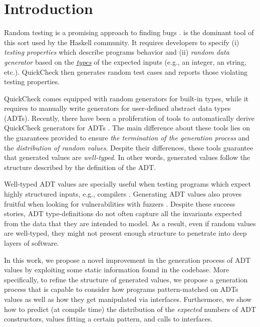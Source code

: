 \section{Introduction}

Random testing is a promising approach to finding bugs
\cite{HughesNSA16,HughesPAN16,ArtsHNS15}.
%
\quickcheck \cite{ClaessenH00} is the dominant tool of this sort used by the
Haskell community.
%
It requires developers to specify (i) \emph{testing properties} which describe
programs behavior and (ii) \emph{random data generator} based on the
\underline{\emph{types}} of the expected inputs (e.g., an integer, an string,
etc.). %
%
QuickCheck then generates random test cases and reports those violating testing
properties.
%

QuickCheck comes equipped with random generators for built-in types, while it
requires to manually write generators for user-defined abstract data types
(ADTs).
%
Recently, there have been a proliferation of tools to automatically derive
QuickCheck generators for ADTs
\cite{mitchell2007,RuncimanNL08,DuregardJW12,grieco2017,DBLP:conf/haskell/MistaRH18}.
%
The main difference about these tools lies on the guarantees provided to ensure
\emph{the termination of the generation process} and the \emph{distribution of
  random values}.
%
Despite their differences, these tools guarantee that generated values are
\emph{well-typed}.
%
In other words, generated values follow the structure described by the
definition of the ADT.
%

Well-typed ADT values are specially useful when testing programs which expect
highly structured inputs, e.g., compilers \cite{Palka11,MidtgaardJKNN17}.
%
Generating ADT values also proves fruitful when looking for vulnerabilities with
fuzzers \cite{GriecoCB16,grieco2017}.
%
%
Despite these success stories, ADT type-definitions do not often capture all the
invariants expected from the data that they are intended to model.
%
As a result, even if random values are well-typed, they might not present enough
structure to penetrate into deep layers of software.

In this work, we propose a novel improvement in the generation process of ADT
values by exploiting some static information found in the codebase.
%
More specifically, to refine the structure of generated values, we propose a
generation process that is capable to consider how programs pattern-matched on
ADTs values as well as how they get manipulated via interfaces.
%
Furthermore, we show how to predict (at compile time) the distribution of the
\emph{expected} numbers of ADT constructors, values fitting a certain pattern,
and calls to interfaces.
%

